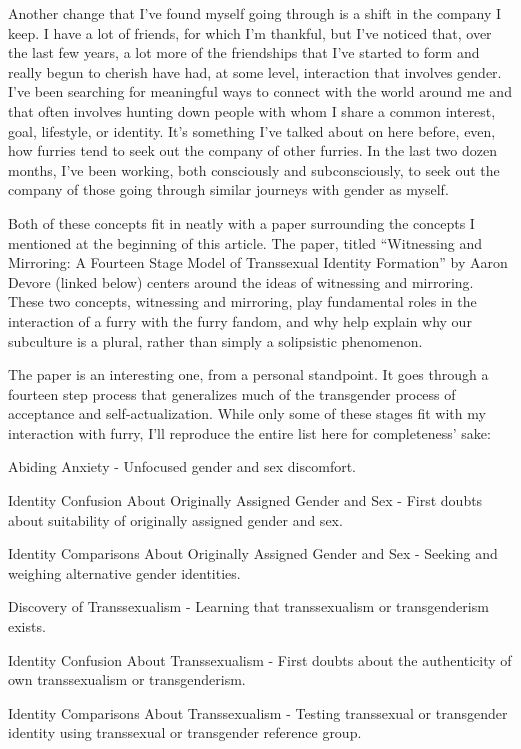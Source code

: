 Another change that I've found myself going through is a shift in the company I keep. I have a lot of friends, for which I'm thankful, but I've noticed that, over the last few years, a lot more of the friendships that I've started to form and really begun to cherish have had, at some level, interaction that involves gender. I've been searching for meaningful ways to connect with the world around me and that often involves hunting down people with whom I share a common interest, goal, lifestyle, or identity. It's something I've talked about on here before, even, how furries tend to seek out the company of other furries. In the last two dozen months, I've been working, both consciously and subconsciously, to seek out the company of those going through similar journeys with gender as myself.

Both of these concepts fit in neatly with a paper surrounding the concepts I mentioned at the beginning of this article. The paper, titled ``Witnessing and Mirroring: A Fourteen Stage Model of Transsexual Identity Formation'' by Aaron Devore (linked below) centers around the ideas of witnessing and mirroring. These two concepts, witnessing and mirroring, play fundamental roles in the interaction of a furry with the furry fandom, and why help explain why our subculture is a plural, rather than simply a solipsistic phenomenon.

The paper is an interesting one, from a personal standpoint. It goes through a fourteen step process that generalizes much of the transgender process of acceptance and self-actualization. While only some of these stages fit with my interaction with furry, I'll reproduce the entire list here for completeness' sake:

Abiding Anxiety - Unfocused gender and sex discomfort.

Identity Confusion About Originally Assigned Gender and Sex - First doubts about suitability of originally assigned gender and sex.

Identity Comparisons About Originally Assigned Gender and Sex - Seeking and weighing alternative gender identities.

Discovery of Transsexualism - Learning that transsexualism or transgenderism exists.

Identity Confusion About Transsexualism - First doubts about the authenticity of own transsexualism or transgenderism.

Identity Comparisons About Transsexualism - Testing transsexual or transgender identity using transsexual or transgender reference group.

